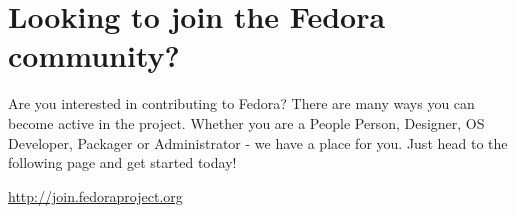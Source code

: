 \documentclass[
letterpaper,
10pt
]{leaflet}
\begin{document}
\section{\textcolor{FedoraBlue}{Looking to join the Fedora community?}}
Are you interested in contributing to Fedora? There are many ways you can become active in the project.  Whether you are a People Person, Designer, OS Developer, Packager or Administrator - we have a place for you. Just head to the following page and get started today!

\begin{center}\href{http://join.fedoraproject.org}{http://join.fedoraproject.org}\end{center}
\end{document}
